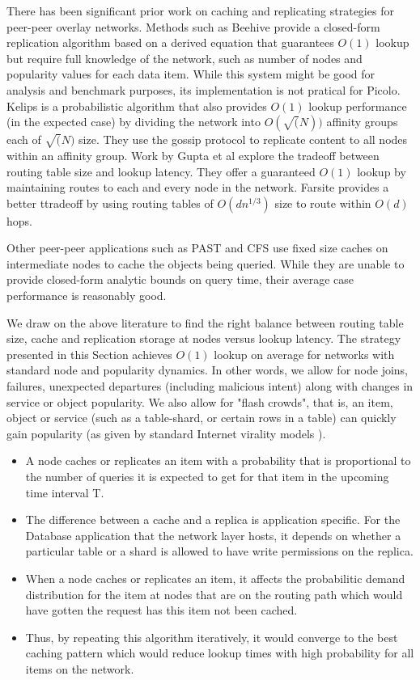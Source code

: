 There has been significant prior work on caching and replicating strategies for peer-peer overlay networks. Methods such
as Beehive \cite{beehive} provide a closed-form replication algorithm based on a derived equation that guarantees
\(O(1)\) lookup but require full knowledge of the network, such as number of nodes and popularity values for each data
item. While this system might be good for analysis and benchmark purposes, its implementation is not pratical for
Picolo. Kelips \cite{kelips} is a probabilistic algorithm that also provides \(O(1)\) lookup performance (in the
expected case) by dividing the network into \(O(\sqrt(N))\) affinity groups each of \(\sqrt(N)\) size. They use the
gossip protocol to replicate content to all nodes within an affinity group. Work by Gupta et al \cite{one_hop_lookup}
explore the tradeoff between routing table size and lookup latency. They offer a guaranteed \(O(1)\) lookup by
maintaining routes to each and every node in the network. Farsite \cite{farsite} provides a better ttradeoff by using
routing tables of \(O(dn^{1/3})\) size to route within \(O(d)\) hops.

Other peer-peer applications such as PAST \cite{past} and CFS \cite{cfs} use fixed size caches on intermediate nodes to
cache the objects being queried. While they are unable to provide closed-form analytic bounds on query time, their
average case performance is reasonably good.

We draw on the above literature to find the right balance between routing table size, cache and replication storage at
nodes versus lookup latency. The strategy presented in this Section achieves \(O(1)\) lookup on average for networks with standard node
and popularity dynamics. In other words, we allow for node joins, failures, unexpected departures (including malicious
intent) along with changes in service or object popularity. We also allow for "flash crowds", that is, an item, object
or service (such as a table-shard, or certain rows in a table) can quickly gain popularity (as given by standard
Internet virality models \cite{virality_model}).

\begin{itemize}
    \item A node caches or replicates an item with a probability that is proportional to the number of queries it is
        expected to get for that item in the upcoming time interval T.
    \item The difference between a cache and a replica is application specific. For the Database application that the
        network layer hosts, it depends on whether a particular table or a shard is allowed to have write permissions on
        the replica.
    \item When a node caches or replicates an item, it affects the probabilitic demand distribution for the item at
        nodes that are on the routing path which would have gotten the request has this item not been cached.
    \item Thus, by repeating this algorithm iteratively, it would converge to the best caching pattern which would reduce
        lookup times with high probability for all items on the network.
\end{itemize}


